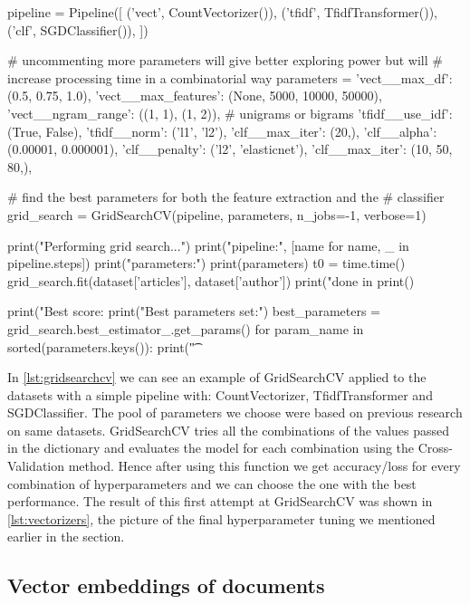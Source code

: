 \begin{lstlisting}[frame=none,caption={GridSearchCV with BOW, TFIDF and SGD.},captionpos=b,label=lst:gridsearchcv]
\end{lstlisting}
\begin{python}	
	pipeline = Pipeline([
	('vect', CountVectorizer()),
	('tfidf', TfidfTransformer()),
	('clf', SGDClassifier()),
	])
	
	# uncommenting more parameters will give better exploring power but will
	# increase processing time in a combinatorial way
	parameters = {
		'vect__max_df': (0.5, 0.75, 1.0),
		'vect__max_features': (None, 5000, 10000, 50000),
		'vect__ngram_range': ((1, 1), (1, 2)),  # unigrams or bigrams
		'tfidf__use_idf': (True, False),
		'tfidf__norm': ('l1', 'l2'),
		'clf__max_iter': (20,),
		'clf__alpha': (0.00001, 0.000001),
		'clf__penalty': ('l2', 'elasticnet'),
		'clf__max_iter': (10, 50, 80,),
	}
	
	# find the best parameters for both the feature extraction and the
	# classifier
	grid_search = GridSearchCV(pipeline, parameters, n_jobs=-1, verbose=1)
	
	print("Performing grid search...")
	print("pipeline:", [name for name, _ in pipeline.steps])
	print("parameters:")
	print(parameters)
	t0 = time.time()
	grid_search.fit(dataset['articles'], dataset['author'])
	print("done in %
	print()
	
	print("Best score: %
	print("Best parameters set:")
	best_parameters = grid_search.best_estimator_.get_params()
	for param_name in sorted(parameters.keys()):
	print("\t%
\end{python}

 In \autoref{lst:gridsearchcv} we can see an example of GridSearchCV applied to the datasets with a simple pipeline with: CountVectorizer, TfidfTransformer and SGDClassifier. The pool of parameters we choose were based on previous research on same datasets.
GridSearchCV tries all the combinations of the values passed in the dictionary and evaluates the model for each combination using the Cross-Validation method. Hence after using this function we get accuracy/loss for every combination of hyperparameters and we can choose the one with the best performance. The result of this first attempt at GridSearchCV was shown in \autoref{lst:vectorizers}, the picture of the final hyperparameter tuning we mentioned earlier in the section.

\subsection{Vector embeddings of documents}

